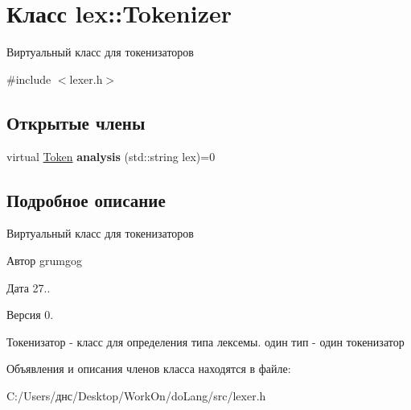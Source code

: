 \hypertarget{classlex_1_1_tokenizer}{}\section{Класс lex\+:\+:Tokenizer}
\label{classlex_1_1_tokenizer}


Виртуальный класс для токенизаторов  




{\ttfamily \#include $<$lexer.\+h$>$}

\subsection*{Открытые члены}
\begin{DoxyCompactItemize}
\item 
\mbox{\label{classlex_1_1_tokenizer_a6fd22f79c30b936923c2e408eaaf835c}} 
virtual \hyperlink{classlex_1_1_token}{Token} {\bfseries analysis} (std\+::string lex)=0
\end{DoxyCompactItemize}


\subsection{Подробное описание}
Виртуальный класс для токенизаторов 

\begin{DoxyAuthor}{Автор}
grumgog 
\end{DoxyAuthor}
\begin{DoxyDate}{Дата}
27.. 
\end{DoxyDate}
\begin{DoxyVersion}{Версия}
0.
\end{DoxyVersion}
Токенизатор -\/ класс для определения типа лексемы. один тип -\/ один токенизатор 

Объявления и описания членов класса находятся в файле\+:\begin{DoxyCompactItemize}
\item 
C\+:/\+Users/днс/\+Desktop/\+Work\+On/do\+Lang/src/lexer.\+h\end{DoxyCompactItemize}
